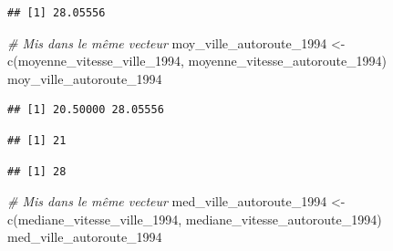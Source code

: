 \documentclass[
]{article}
\newenvironment{Shaded}{\begin{snugshade}}{\end{snugshade}}
\newcommand{\CommentTok}[1]{\textcolor[rgb]{0.56,0.35,0.01}{\textit{#1}}}
\newcommand{\FunctionTok}[1]{\textcolor[rgb]{0.00,0.00,0.00}{#1}}
\newcommand{\NormalTok}[1]{#1}
\newcommand{\OtherTok}[1]{\textcolor[rgb]{0.56,0.35,0.01}{#1}}
\newcommand{\SpecialCharTok}[1]{\textcolor[rgb]{0.00,0.00,0.00}{#1}}
\begin{document}
\begin{verbatim}
## [1] 28.05556
\end{verbatim}

\begin{Shaded}
\begin{Highlighting}[]
  \CommentTok{\# Mis dans le même vecteur}
\NormalTok{moy\_ville\_autoroute\_1994 }\OtherTok{\textless{}{-}} \FunctionTok{c}\NormalTok{(moyenne\_vitesse\_ville\_1994, moyenne\_vitesse\_autoroute\_1994)}
\NormalTok{moy\_ville\_autoroute\_1994}
\end{Highlighting}
\end{Shaded}

\begin{verbatim}
## [1] 20.50000 28.05556
\end{verbatim}

\begin{Shaded}
\end{Shaded}

\begin{verbatim}
## [1] 21
\end{verbatim}

\begin{Shaded}
\end{Shaded}

\begin{verbatim}
## [1] 28
\end{verbatim}

\begin{Shaded}
\begin{Highlighting}[]
  \CommentTok{\# Mis dans le même vecteur}
\NormalTok{med\_ville\_autoroute\_1994 }\OtherTok{\textless{}{-}} \FunctionTok{c}\NormalTok{(mediane\_vitesse\_ville\_1994, mediane\_vitesse\_autoroute\_1994)}
\NormalTok{med\_ville\_autoroute\_1994}
\end{Highlighting}
\end{Shaded}
\end{document}
